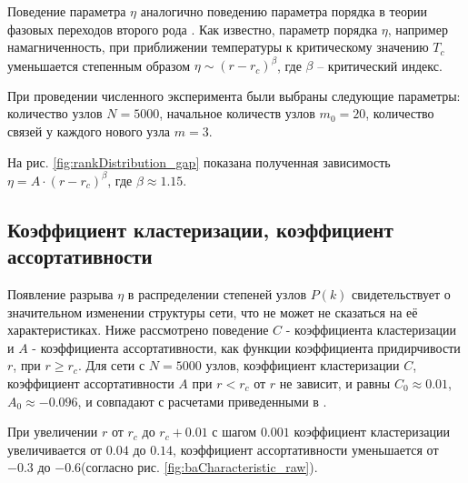 \documentclass[10pt,aps,pra]{revtex4-1}
\begin{document}
        Поведение параметра $\eta$ аналогично поведению параметра порядка в теории фазовых переходов второго рода \cite{Landau}. Как известно, параметр порядка $\eta$, например намагниченность, при приближении температуры к критическому значению $T_c$ уменьшается степенным образом $\eta \sim (r-r_c)^\beta$, где $\beta$ – критический индекс. 

        При проведении численного эксперимента были выбраны следующие параметры: количество узлов $N=5000$, начальное количеств узлов $m_0=20$, количество связей у каждого нового узла $m=3$.

        На рис. \ref{fig:rankDistribution_gap} показана полученная зависимость $\eta = A \cdot {(r-r_c)}^\beta$, где $\beta \approx 1.15$.

    \subsection{Коэффициент кластеризации, коэффициент ассортативности}

        Появление разрыва $\eta$ в распределении степеней узлов $P(k)$ свидетельствует о значительном изменении структуры сети, что не может не сказаться на её характеристиках. Ниже рассмотрено поведение $C$ - коэффициента кластеризации и $A$ - коэффициента ассортативности, как функции коэффициента придирчивости $r$, при $r \geq r_c$. Для сети с $N=5000$ узлов, коэффициент кластеризации $C$, коэффициент ассортативности $A$ при $r<r_c$ от $r$ не зависит, и равны $C_0 \approx 0.01$, $A_0 \approx -0.096$, и совпадают с расчетами приведенными в \cite{AlBa2,Newman2}. 

        При увеличении $r$ от $r_c$ до $r_c + 0.01$ с шагом $0.001$ коэффициент кластеризации увеличивается от $0.04$ до $0.14$, коэффициент ассортативности уменьшается от $-0.3$ до $-0.6$(согласно рис. \ref{fig:baCharacteristic_raw}).
\end{document}
